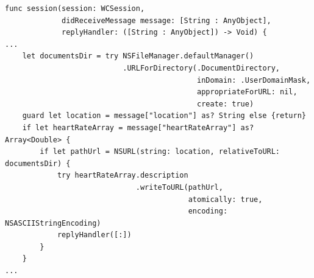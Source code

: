 \begin{lstlisting}[label={lst:wcsessionreceive},caption={Receiving heart rate
data on phone, and storing it to the Documents folder.},basicstyle=\small]
func session(session: WCSession, 
             didReceiveMessage message: [String : AnyObject], 
             replyHandler: ([String : AnyObject]) -> Void) {
...
    let documentsDir = try NSFileManager.defaultManager()
                           .URLForDirectory(.DocumentDirectory, 
                                            inDomain: .UserDomainMask,
                                            appropriateForURL: nil, 
                                            create: true)
    guard let location = message["location"] as? String else {return}
    if let heartRateArray = message["heartRateArray"] as? Array<Double> {
        if let pathUrl = NSURL(string: location, relativeToURL: documentsDir) {
            try heartRateArray.description
                              .writeToURL(pathUrl, 
                                          atomically: true, 
                                          encoding: NSASCIIStringEncoding)
            replyHandler([:])
        }
    }
...
\end{lstlisting}
